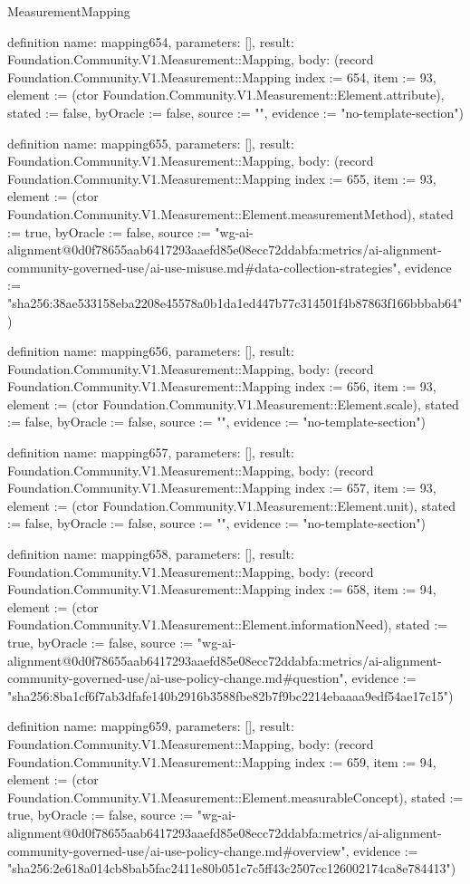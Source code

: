 \begin{lexlean}{MeasurementMapping}
\begin{semanticmodule}
definition{
  name: mapping654,
  parameters: [],
  result: Foundation.Community.V1.Measurement::Mapping,
  body: (record Foundation.Community.V1.Measurement::Mapping {index := 654, item := 93, element := (ctor Foundation.Community.V1.Measurement::Element.attribute), stated := false, byOracle := false, source := "", evidence := "no-template-section"})
}

definition{
  name: mapping655,
  parameters: [],
  result: Foundation.Community.V1.Measurement::Mapping,
  body: (record Foundation.Community.V1.Measurement::Mapping {index := 655, item := 93, element := (ctor Foundation.Community.V1.Measurement::Element.measurementMethod), stated := true, byOracle := false, source := "wg-ai-alignment@0d0f78655aab6417293aaefd85e08ecc72ddabfa:metrics/ai-alignment-community-governed-use/ai-use-misuse.md#data-collection-strategies", evidence := "sha256:38ae533158eba2208e45578a0b1da1ed447b77c314501f4b87863f166bbbab64"})
}

definition{
  name: mapping656,
  parameters: [],
  result: Foundation.Community.V1.Measurement::Mapping,
  body: (record Foundation.Community.V1.Measurement::Mapping {index := 656, item := 93, element := (ctor Foundation.Community.V1.Measurement::Element.scale), stated := false, byOracle := false, source := "", evidence := "no-template-section"})
}

definition{
  name: mapping657,
  parameters: [],
  result: Foundation.Community.V1.Measurement::Mapping,
  body: (record Foundation.Community.V1.Measurement::Mapping {index := 657, item := 93, element := (ctor Foundation.Community.V1.Measurement::Element.unit), stated := false, byOracle := false, source := "", evidence := "no-template-section"})
}

definition{
  name: mapping658,
  parameters: [],
  result: Foundation.Community.V1.Measurement::Mapping,
  body: (record Foundation.Community.V1.Measurement::Mapping {index := 658, item := 94, element := (ctor Foundation.Community.V1.Measurement::Element.informationNeed), stated := true, byOracle := false, source := "wg-ai-alignment@0d0f78655aab6417293aaefd85e08ecc72ddabfa:metrics/ai-alignment-community-governed-use/ai-use-policy-change.md#question", evidence := "sha256:8ba1cf6f7ab3dfafe140b2916b3588fbe82b7f9bc2214ebaaaa9edf54ae17c15"})
}

definition{
  name: mapping659,
  parameters: [],
  result: Foundation.Community.V1.Measurement::Mapping,
  body: (record Foundation.Community.V1.Measurement::Mapping {index := 659, item := 94, element := (ctor Foundation.Community.V1.Measurement::Element.measurableConcept), stated := true, byOracle := false, source := "wg-ai-alignment@0d0f78655aab6417293aaefd85e08ecc72ddabfa:metrics/ai-alignment-community-governed-use/ai-use-policy-change.md#overview", evidence := "sha256:2e618a014cb8bab5fac2411e80b051c7c5ff43c2507cc126002174ca8e784413"})
}


\end{semanticmodule}
\end{lexlean}
